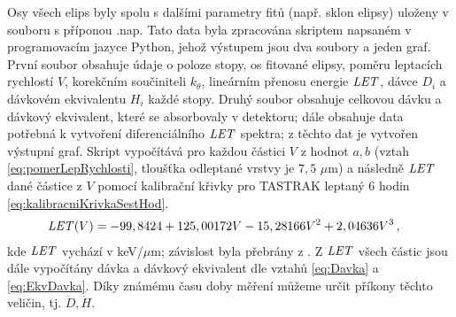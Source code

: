 Osy všech elips byly spolu s dalšími parametry fitů (např. sklon elipsy) uloženy v souboru s příponou .nap. Tato data byla zpracována skriptem napsaném v programovacím jazyce Python, jehož výstupem jsou dva soubory a jeden graf. První soubor obsahuje údaje o poloze stopy, os fitované elipsy, poměru leptacích rychlostí $V$, korekčním součiniteli $k_{\theta}$, lineárním přenosu energie $\mathit{LET}$, dávce $D_i$ a dávkovém ekvivalentu $H_i$ každé stopy. Druhý soubor obsahuje celkovou dávku a dávkový ekvivalent, které se absorbovaly v detektoru; dále obsahuje data potřebná k vytvoření diferenciálního $\mathit{LET}$ spektra; z těchto dat je vytvořen výstupní graf. Skript vypočítává pro každou částici $V$ z hodnot $a,b$ (vztah \eqref{eq:pomerLepRychlosti}, tloušťka odleptané vrstvy je $7,5$
$\mu$m) a následně $\mathit{LET}$ dané částice z $V$ pomocí kalibrační křivky pro TASTRAK leptaný 6 hodin \eqref{eq:kalibracniKrivkaSestHod}.
\begin{align}
  \mathit{LET}(V) &= -99,8424+125,00172  V-15,28166  V^2+2,04636  V^3\,,\label{eq:kalibracniKrivkaSestHod}
\end{align}
kde $\mathit{LET}$ vychází v keV/$\mu$m; závislost byla přebrány z \cite{ssntd}. Z $\mathit{LET}$ všech částic jsou dále vypočítány dávka a dávkový ekvivalent dle vztahů \eqref{eq:Davka} a \eqref{eq:EkvDavka}. Díky známému času doby měření můžeme určit příkony těchto veličin, tj. $\dot{D}, \dot{H}$.


